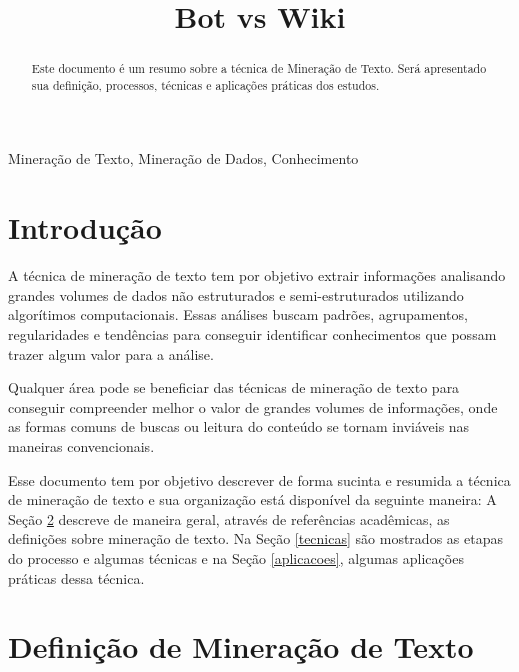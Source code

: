 \documentclass[conference]{IEEEtran}
\begin{document}
\title{Bot vs Wiki}

\author{
}

\maketitle

\begin{abstract}
Este documento é um resumo sobre a técnica de Mineração de Texto. Será apresentado sua definição, processos, técnicas e aplicações práticas dos estudos.
\end{abstract}

\begin{IEEEkeywords}
Mineração de Texto, Mineração de Dados, Conhecimento
\end{IEEEkeywords}

\section{Introdução}
A técnica de mineração de texto tem por objetivo extrair informações  analisando grandes volumes de dados não estruturados e semi-estruturados utilizando algorítimos computacionais. Essas análises buscam padrões, agrupamentos, regularidades e tendências para conseguir identificar conhecimentos que possam trazer algum  valor para a análise.

Qualquer área pode se beneficiar das técnicas de mineração de texto para conseguir compreender melhor o valor de grandes volumes de informações, onde as formas comuns de buscas ou leitura do conteúdo se tornam inviáveis nas maneiras convencionais.

Esse documento tem por objetivo descrever de forma sucinta e resumida a técnica de mineração de texto e sua organização está disponível da seguinte maneira: A Seção \ref{definicao} descreve de maneira geral, através de referências acadêmicas, as definições sobre mineração de texto. Na Seção \ref{tecnicas} são mostrados as etapas do processo e algumas técnicas e na Seção \ref{aplicacoes}, algumas aplicações práticas dessa técnica.

\section{Definição de Mineração de Texto}\label{definicao}
\end{document}
